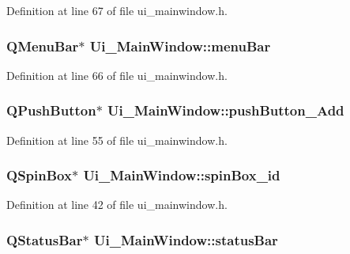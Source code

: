 Definition at line 67 of file ui\+\_\+mainwindow.\+h.

\hypertarget{class_ui___main_window_a2be1c24ec9adfca18e1dcc951931457f}{}
\subsubsection[{menu\+Bar}]{\setlength{\rightskip}{0pt plus 5cm}Q\+Menu\+Bar$\ast$ Ui\+\_\+\+Main\+Window\+::menu\+Bar}\label{class_ui___main_window_a2be1c24ec9adfca18e1dcc951931457f}


Definition at line 66 of file ui\+\_\+mainwindow.\+h.

\hypertarget{class_ui___main_window_a777806fd64c2c8374a96d93416bb6755}{}
\subsubsection[{push\+Button\+\_\+\+Add}]{\setlength{\rightskip}{0pt plus 5cm}Q\+Push\+Button$\ast$ Ui\+\_\+\+Main\+Window\+::push\+Button\+\_\+\+Add}\label{class_ui___main_window_a777806fd64c2c8374a96d93416bb6755}


Definition at line 55 of file ui\+\_\+mainwindow.\+h.

\hypertarget{class_ui___main_window_a99f69f054874249400f1fb09736ecc4a}{}
\subsubsection[{spin\+Box\+\_\+id}]{\setlength{\rightskip}{0pt plus 5cm}Q\+Spin\+Box$\ast$ Ui\+\_\+\+Main\+Window\+::spin\+Box\+\_\+id}\label{class_ui___main_window_a99f69f054874249400f1fb09736ecc4a}


Definition at line 42 of file ui\+\_\+mainwindow.\+h.

\hypertarget{class_ui___main_window_a50fa481337604bcc8bf68de18ab16ecd}{}
\subsubsection[{status\+Bar}]{\setlength{\rightskip}{0pt plus 5cm}Q\+Status\+Bar$\ast$ Ui\+\_\+\+Main\+Window\+::status\+Bar}\label{class_ui___main_window_a50fa481337604bcc8bf68de18ab16ecd}



